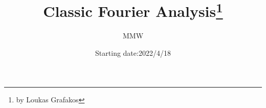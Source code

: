 \usepackage{hyperref}
\usepackage{amsmath}
\usepackage{amsfonts}
\usepackage{amsthm}
\usepackage{physics}
\usepackage{amssymb}
\usepackage{color,xcolor}


\hypersetup{
colorlinks=true,
linkcolor=black
}

{



\theoremstyle{definition}  


\newtheorem*{example*}{Example}
\newtheorem{example}{Example}

\newtheorem*{proposition*}{\bfseries Proposition}
\newtheorem{proposition}{\bfseries Proposition}



\newtheorem*{definition*}{\bfseries Definition}
\newtheorem{definition}{\bfseries Definition}

\newtheorem{theorem}{\bfseries Theorem}
\newtheorem*{theorem*}{\bfseries Theorem}

\newtheorem{lemma}{\bfseries Lemma}
\newtheorem*{lemma*}{\bfseries Lemma}

}

{
\theoremstyle{remark}
\newtheorem*{remark*}{\bfseries Remark}
}


\newcommand{\question}[0]{\noindent\textcolor{red}{\large\bfseries Question:\vspace{1ex}}}

\newcommand{\answer}[1]{\noindent\textcolor{cyan}{\large\bfseries Answer:}{ \,\,#1}\hfill \mbox{}  \hfill $\blacksquare$}

\newcommand{\solution}[0]{\noindent\textcolor{cyan}{\large\bfseries Solution:}}

\newcommand{\myend}[0]{\hfill \mbox{}\hfill $\blacksquare$}

\author{MMW}
\date{Starting date:2022/4/18}
\title{Classic Fourier Analysis\footnote{by Loukas Grafakos}}

\endinput